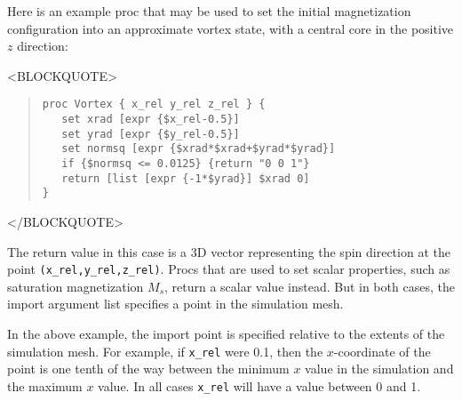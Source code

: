 Here is an example proc that may be used to set the initial
magnetization configuration into an approximate vortex state, with a
central core in the positive $z$ direction:
\begin{rawhtml}<BLOCKQUOTE>\end{rawhtml}
\begin{quote}
\begin{verbatim}
proc Vortex { x_rel y_rel z_rel } {
   set xrad [expr {$x_rel-0.5}]
   set yrad [expr {$y_rel-0.5}]
   set normsq [expr {$xrad*$xrad+$yrad*$yrad}]
   if {$normsq <= 0.0125} {return "0 0 1"}
   return [list [expr {-1*$yrad}] $xrad 0]
}
\end{verbatim}
\end{quote}
\begin{rawhtml}</BLOCKQUOTE>\end{rawhtml}
The return value in this case is a 3D vector representing the spin
direction at the point \texttt{(x\_rel,y\_rel,z\_rel)}.  Procs
that are used to set scalar properties, such as saturation
magnetization $M_s$, return a scalar value instead.  But in both
cases, the import argument list specifies a point in the simulation
mesh.

In the above example, the import point is specified relative to the
extents of the simulation mesh.  For example, if \texttt{x\_rel} were
0.1, then the $x$-coordinate of the point is one tenth of the way
between the minimum $x$ value in the simulation  and the maximum $x$
value.  In all cases \texttt{x\_rel} will have a value between 0 and
1.

